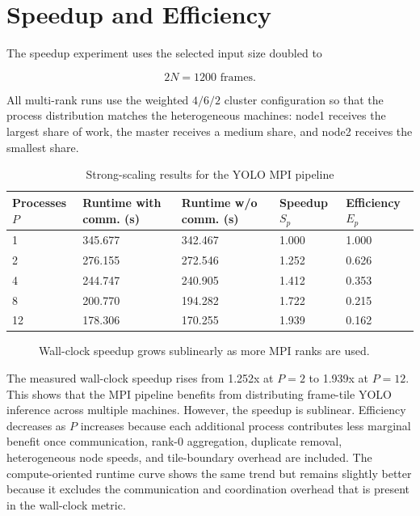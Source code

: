 \section{Speedup and Efficiency}\label{sec:speedup-efficiency}

The speedup experiment uses the selected input size doubled to

\[
2N = 1200 \text{ frames}.
\]

All multi-rank runs use the weighted $4/6/2$ cluster configuration so that the process distribution matches the heterogeneous machines: node1 receives the largest share of work, the master receives a medium share, and node2 receives the smallest share.

\begin{table}[H]
\centering
\caption{Strong-scaling results for the YOLO MPI pipeline}
\label{tab:speedup}
\small
\begin{tabularx}{\textwidth}{C{1.6cm} C{2.3cm} C{2.3cm} C{2.0cm} C{1.9cm}}
\toprule
Processes $P$ & Runtime with comm. (s) & Runtime w/o comm. (s) & Speedup $S_p$ & Efficiency $E_p$ \\
 & 345.677 & 342.467 & 1.000 & 1.000 \\
2 & 276.155 & 272.546 & 1.252 & 0.626 \\
4 & 244.747 & 240.905 & 1.412 & 0.353 \\
8 & 200.770 & 194.282 & 1.722 & 0.215 \\
12 & 178.306 & 170.255 & 1.939 & 0.162 \\
\bottomrule
\end{tabularx}
\end{table}

\begin{figure}[H]
\centering
{}
\caption{Wall-clock speedup grows sublinearly as more MPI ranks are used.}
\label{fig:speedup}
\end{figure}

The measured wall-clock speedup rises from 1.252x at $P = 2$ to 1.939x at $P = 12$. This shows that the MPI pipeline benefits from distributing frame-tile YOLO inference across multiple machines. However, the speedup is sublinear. Efficiency decreases as $P$ increases because each additional process contributes less marginal benefit once communication, rank-0 aggregation, duplicate removal, heterogeneous node speeds, and tile-boundary overhead are included. The compute-oriented runtime curve shows the same trend but remains slightly better because it excludes the communication and coordination overhead that is present in the wall-clock metric.


